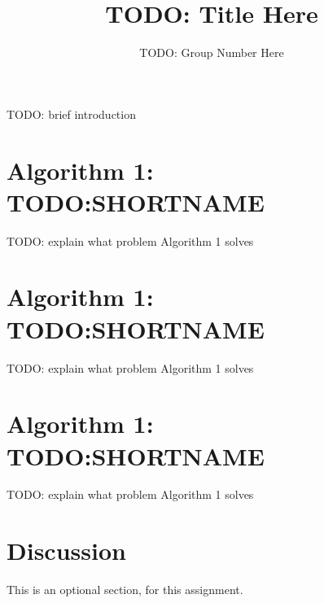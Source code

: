 \documentclass[11pt]{article}
\title{TODO: Title Here}
\author{TODO: Group Number Here}
\begin{document}
\maketitle

TODO: brief introduction

\section{Algorithm 1: TODO:SHORTNAME}
TODO: explain what problem Algorithm 1 solves

\section{Algorithm 1: TODO:SHORTNAME}
TODO: explain what problem Algorithm 1 solves

\section{Algorithm 1: TODO:SHORTNAME}
TODO: explain what problem Algorithm 1 solves

\section{Discussion}
This is an optional section, for this assignment.
\end{document}

